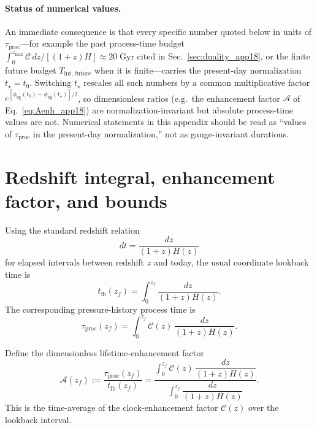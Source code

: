 \documentclass[11pt]{article}
\begin{document}
\paragraph{Status of numerical values.}
An immediate consequence is that every specific number quoted below in
units of $\tau_{\mathrm{proc}}$---for example the past process-time budget
$\int_0^{z_{\max}}\mathcal{C}\,dz/[(1{+}z)H]\approx 20\;\mathrm{Gyr}$
cited in Sec.~\ref{sec:duality_app18}, or the finite future budget
$T_{\mathrm{int,\,future}}$ when it is finite---carries the present-day
normalization $t_\star=t_0$.  Switching $t_\star$ rescales all such
numbers by a common multiplicative factor
$e^{[\phi_{\mathrm{bg}}(t_0)-\phi_{\mathrm{bg}}(t_\star)]/2}$, so
dimensionless ratios (e.g.\ the enhancement factor $\mathcal{A}$ of
Eq.~\ref{eq:Aenh_app18}) are normalization-invariant but absolute
process-time values are not.  Numerical statements in this appendix
should be read as ``values of $\tau_{\mathrm{proc}}$ in the present-day
normalization,'' not as gauge-invariant durations.

\section{Redshift integral, enhancement factor, and bounds}
\label{sec:tauproc_integral_app18}

Using the standard redshift relation
\begin{equation}
  dt = \frac{dz}{(1+z)H(z)}
\end{equation}
for elapsed intervals between redshift $z$ and today, the usual
coordinate lookback time is
\begin{equation}
  t_{\mathrm{lb}}(z_f)
  = \int_0^{z_f}\frac{dz}{(1+z)H(z)}.
  \label{eq:tlb_app18}
\end{equation}
The corresponding pressure-history process time is
\begin{equation}
  \tau_{\mathrm{proc}}(z_f)
  = \int_0^{z_f}
    \mathcal{C}(z)\,
    \frac{dz}{(1+z)H(z)}.
  \label{eq:tauproc_int}
\end{equation}

Define the dimensionless lifetime-enhancement factor
\begin{equation}
  \mathcal{A}(z_f)
  := \frac{\tau_{\mathrm{proc}}(z_f)}{t_{\mathrm{lb}}(z_f)}
  = \frac{\int_0^{z_f}\mathcal{C}(z)\,\dfrac{dz}{(1+z)H(z)}}
         {\int_0^{z_f}\dfrac{dz}{(1+z)H(z)}}.
  \label{eq:Aenh_app18}
\end{equation}
This is the time-average of the clock-enhancement factor
$\mathcal{C}(z)$ over the lookback interval.
\end{document}
